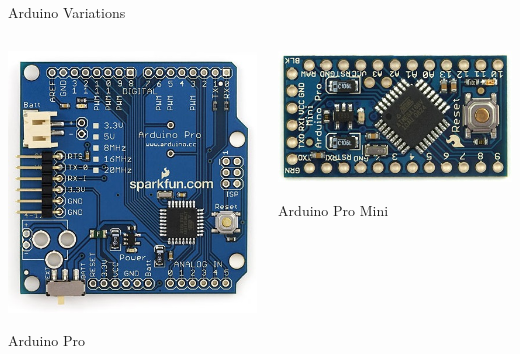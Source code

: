 \documentclass{beamer}
\begin{document}
\begin{frame}{Arduino Variations}
  \begin{columns}
    \begin{column}{0.5\textwidth}
      \pause
      \centerline{\includegraphics[width=.95\textwidth]{ArduinoPro.jpg}}
      \centerline{Arduino Pro}
    \end{column}
    \begin{column}{0.5\textwidth}
      \pause
      \centerline{\includegraphics[width=.95\textwidth]{ArduinoProMini.jpg}}
      \centerline{Arduino Pro Mini}
    \end{column}
  \end{columns}
\end{frame}
\end{document}
